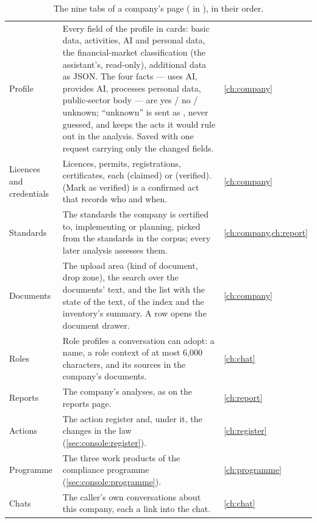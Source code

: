 \begin{table}[H]
\caption{The nine tabs of a company's page ( in ), in their
order.}\label{tab:console:companytabs}
\begin{tabularx}{\textwidth}{@{}L{38mm}YL{19mm}@{}}
\toprule
{} &  &  \\
\midrule
{} Profile & Every field of the profile in cards: basic data, activities, AI and
personal data, the financial-market classification (the assistant's, read-only), additional
data as JSON. The four facts --- uses AI, provides AI, processes personal data, public-sector
body --- are yes / no / unknown; \enquote{unknown} is sent as , never guessed, and keeps the acts it
would rule out in the analysis. Saved with one request carrying only the changed fields. &
\cref{ch:company} \\
 Licences and credentials & Licences, permits, registrations,
certificates, each  (claimed) or  (verified).
 (Mark as verified) is a confirmed act that records who and when. &
\cref{ch:company} \\
 Standards & The standards the company is certified to, implementing or planning,
picked from the standards in the corpus; every later analysis assesses them. &
\cref{ch:company,ch:report} \\
 Documents & The upload area (kind of document, drop zone), the search over the
documents' text, and the list with the state of the text, of the index and the inventory's
summary. A row opens the document drawer. & \cref{ch:company} \\
 Roles & Role profiles a conversation can adopt: a name, a role context of at most
6,000 characters, and its sources in the company's documents. & \cref{ch:chat} \\
 Reports & The company's analyses, as on the reports page. & \cref{ch:report} \\
 Actions & The action register and, under it, the changes in the law
(\cref{sec:console:register}). & \cref{ch:register} \\
 Programme & The three work products of the compliance programme
(\cref{sec:console:programme}). & \cref{ch:programme} \\
 Chats & The caller's own conversations about this company, each a link into the
chat. & \cref{ch:chat} \\
\bottomrule
\end{tabularx}
\end{table}

